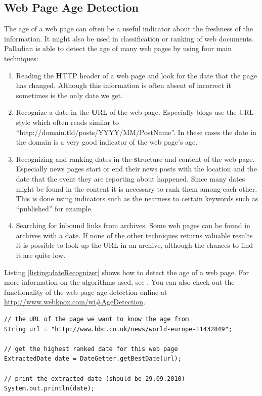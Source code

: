 \documentclass[a4paper,twoside]{book}      %
\begin{document}
\subsection{Web Page Age Detection}
The age of a web page can often be a useful indicator about the freshness of the information. It might also be used in classification or ranking of web documents. Palladian is able to detect the age of many web pages by using four main techniques:
\begin{enumerate}
\item Reading the {\textbf HTTP header} of a web page and look for the date that the page has changed. Although this information is often absent of incorrect it sometimes is the only date we get.
\item Recognize a date in the {\textbf URL} of the web page. Especially blogs use the URL style which often reads similar to ``http://domain.tld/posts/YYYY/MM/PostName''. In these cases the date in the domain is a very good indicator of the web page's age.
\item Recognizing and ranking dates in the {\textbf structure and content} of the web page. Especially news pages start or end their news posts with the location and the date that the event they are reporting about happened. Since many dates might be found in the content it is necessary to rank them among each other. This is done using indicators such as the nearness to certain keywords such as ``published'' for example.
\item Searching for {\textbf inbound links from archives}. Some web pages can be found in archives with a date. If none of the other techniques returns valuable results it is possible to look up the URL in an archive, although the chances to find it are quite low.
\end{enumerate}

Listing \ref{listing:dateRecognizer} shows how to detect the age of a web page. For more information on the algorithms used, see \cite{gregor2010bachelor}. You can also check out the functionality of the web page age detection online at \url{http://www.webknox.com/wi#AgeDetection}.

\begin{codelisting}
\label{listing:dateRecognizer}
\begin{lstlisting}[frame=tb]
// the URL of the page we want to know the age from
String url = "http://www.bbc.co.uk/news/world-europe-11432849";

// get the highest ranked date for this web page
ExtractedDate date = DateGetter.getBestDate(url);

// print the extracted date (should be 29.09.2010)
System.out.println(date);
\end{lstlisting}
\end{codelisting}
\end{document}
